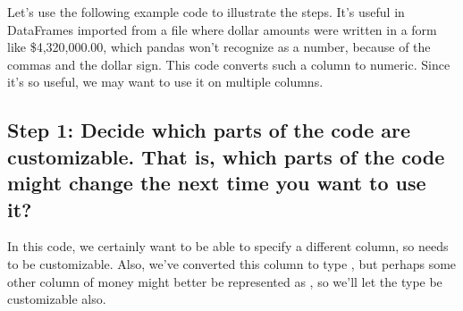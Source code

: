 \documentclass[letterpaper,10pt,english]{sphinxmanual}
\begin{document}
Let’s use the following example code to illustrate the steps.  It’s useful in DataFrames imported from a file where dollar amounts were written in a form like \$4,320,000.00, which pandas won’t recognize as a number, because of the commas and the dollar sign.  This code converts such a column to numeric.  Since it’s so useful, we may want to use it on multiple columns.

\begin{sphinxVerbatim}[commandchars=\\\{\}]
\PYG{p}{[}\PYG{p}{]}  \PYG{p}{[}\PYG{p}{]}    
\PYG{p}{[}\PYG{p}{]}  \PYG{p}{[}\PYG{p}{]}    
\PYG{p}{[}\PYG{p}{]}  \PYG{p}{[}\PYG{p}{]}          
\end{sphinxVerbatim}


\subsection{Step 1:  Decide which parts of the code are customizable.  That is, which parts of the code might change the next time you want to use it?}
\label{\detokenize{chapter-7-abstraction:step-1-decide-which-parts-of-the-code-are-customizable-that-is-which-parts-of-the-code-might-change-the-next-time-you-want-to-use-it}}
In this code, we certainly want to be able to specify a different column, so  needs to be customizable.  Also, we’ve converted this column to type , but perhaps some other column of money might better be represented as , so we’ll let the type be customizable also.
\end{document}
